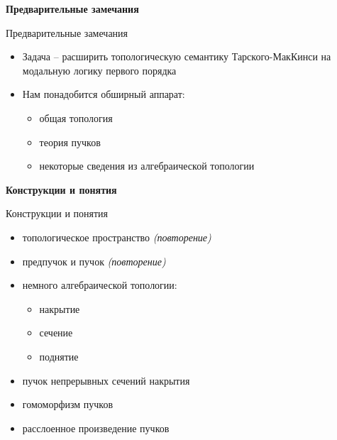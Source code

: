 \documentclass{beamer}
\begin{document}
\begin{frame}{}
\begin{center}
	\textbf{Предварительные замечания}
\end{center}
\end{frame}

\begin{frame}{Предварительные замечания}
\begin{itemize}
	\item Задача -- расширить топологическую семантику Тарского-МакКинси на модальную логику первого порядка
	\medskip
	\item Нам понадобится обширный аппарат:
		\smallskip
		\begin{itemize}
			\item общая топология
			\item теория пучков
			\item некоторые сведения из алгебраической топологии
		\end{itemize}
\end{itemize}
\end{frame}



\begin{frame}{}
\begin{center}
	\textbf{Конструкции и понятия}
\end{center}
\end{frame}

\begin{frame}{Конструкции и понятия}
\begin{itemize}
	\item топологическое пространство {\small \textit{(повторение)}}
	\item предпучок и пучок {\small \textit{(повторение)}}
	\item немного алгебраической топологии:
		\begin{itemize}
			\item накрытие
			\item сечение
			\item поднятие
		\end{itemize}
	\item пучок непрерывных сечений накрытия
	\item гомоморфизм пучков
	\item расслоенное произведение пучков
\end{itemize}
\end{frame}
\end{document}
